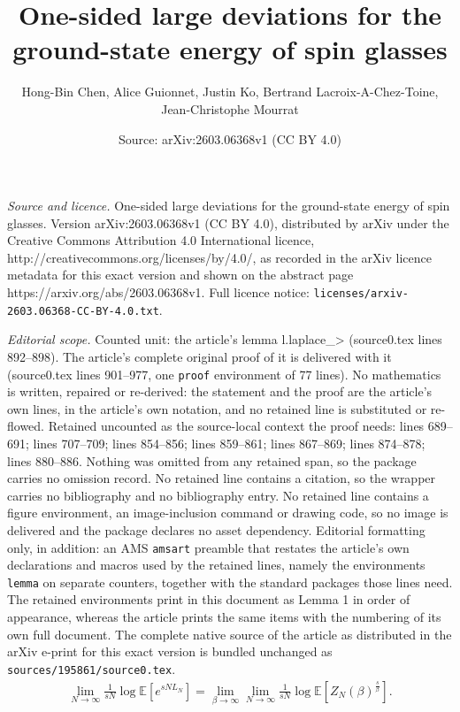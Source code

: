 \documentclass[10pt,a4paper]{amsart}
\title{One-sided large deviations for the ground-state energy of spin glasses}
\author{Hong-Bin Chen, Alice Guionnet, Justin Ko, Bertrand Lacroix-A-Chez-Toine, Jean-Christophe Mourrat}
\date{Source: arXiv:2603.06368v1 (CC BY 4.0)}
\newcommand{\E}{\mathbb{E}}
\newcommand{\Ll}{\left}
\newcommand{\Rr}{\right}
\begin{document}
\maketitle

\noindent\emph{Source and licence.} One-sided large deviations for the ground-state energy of spin glasses. Version arXiv:2603.06368v1 (CC BY 4.0), distributed by arXiv under the Creative Commons Attribution 4.0 International licence, http://creativecommons.org/licenses/by/4.0/, as recorded in the arXiv licence metadata for this exact version and shown on the abstract page https://arxiv.org/abs/2603.06368v1. Full licence notice: \texttt{licenses/arxiv-2603.06368-CC-BY-4.0.txt}.\par\smallskip

\noindent\textit{Editorial scope.} Counted unit: the article's lemma l.laplace\_> (source0.tex lines 892--898). The article's complete original proof of it is delivered with it (source0.tex lines 901--977, one \texttt{proof} environment of 77 lines). No mathematics is written, repaired or re-derived: the statement and the proof are the article's own lines, in the article's own notation, and no retained line is substituted or re-flowed.  Retained uncounted as the source-local context the proof needs: lines 689--691; lines 707--709; lines 854--856; lines 859--861; lines 867--869; lines 874--878; lines 880--886.  Nothing was omitted from any retained span, so the package carries no omission record.  No retained line contains a citation, so the wrapper carries no bibliography and no bibliography entry.  No retained line contains a figure environment, an image-inclusion command or drawing code, so no image is delivered and the package declares no asset dependency.  Editorial formatting only, in addition: an AMS \texttt{amsart} preamble that restates the article's own declarations and macros used by the retained lines, namely the environments \texttt{lemma} on separate counters, together with the standard packages those lines need.  The retained environments print in this document as Lemma 1 in order of appearance, whereas the article prints the same items with the numbering of its own full document.  The complete native source of the article as distributed in the arXiv e-print for this exact version is bundled unchanged as \texttt{sources/195861/source0.tex}.
\begin{align}\label{e.lim1/sNloge^sNL_N}
    \lim_{N\to\infty}\frac{1}{sN}\log \E\Ll[e^{sNL_N}\Rr] = \lim_{\beta\to \infty}\lim_{N\to\infty}\frac{1}{sN}\log \E\Ll[Z_N(\beta)^\frac{s}{\beta}\Rr].
\end{align}
\end{document}
